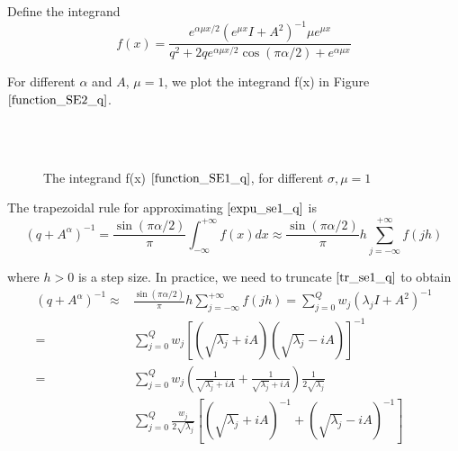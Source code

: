Define the integrand
\begin{equation}
	f(x)=\frac{e^{\alpha\mu x/2}(e^{\mu x} I+A^2)^{-1}\mu e^{\mu x}}{q^2+2qe^{\alpha\mu x/2}\cos(\pi\alpha/2)+e^{\alpha\mu x}}
	\label{function_SE1_q}
\end{equation}

For different $\alpha$ and $A$, $\mu=1$, we plot the integrand f(x) in Figure $\ref{function_SE2_q}$.
\begin{figure}[htbp]
	\centering
	~~
	~~
	\\
	~~
	~~
	\caption{The integrand f(x) $\eqref{function_SE1_q}$, for different $\sigma,\mu=1$}
	\label{function_SE2_q}
\end{figure}

The trapezoidal rule for approximating $\eqref{expu_se1_q}$ is
\begin{equation}
	(q+{A}^{\alpha})^{-1}=\frac{\sin(\pi \alpha/2)}{\pi}\int_{-\infty}^{+\infty}f(x)dx\approx \frac{\sin(\pi \alpha/2)}{\pi} h \sum_{j=-\infty}^{+\infty} f(jh)
	\label{tr_se1_q}
\end{equation}

where $h>0$ is a step size. In practice, we need to truncate $\eqref{tr_se1_q}$ to obtain
\begin{equation}
	\begin{aligned}
		(q+{A}^{\alpha})^{-1}\approx & \frac{\sin(\pi \alpha/2)}{\pi} h\sum_{j=-\infty}^{+\infty} f(jh)
		=\sum_{j=0}^{Q}w_j(\lambda_jI+A^2)^{-1}\\
		=&\sum_{j=0}^{Q}w_j\left[\left(\sqrt{\lambda_j}+iA\right)\left(\sqrt{\lambda_j}-iA\right)\right]^{-1}\\
		=&\sum_{j=0}^{Q}w_j\left(\frac{1}{\sqrt{\lambda_j}+iA}+\frac{1}{\sqrt{\lambda_j}+iA}\right)\frac{1}{2\sqrt{\lambda_j}}\\
		&\sum_{j=0}^{Q}\frac{w_j}{2\sqrt{\lambda_j}}\left[\left(\sqrt{\lambda_j}+iA\right)^{-1}+\left(\sqrt{\lambda_j}-iA\right)^{-1}\right]
		\label{trap_se1}
	\end{aligned}
\end{equation}


